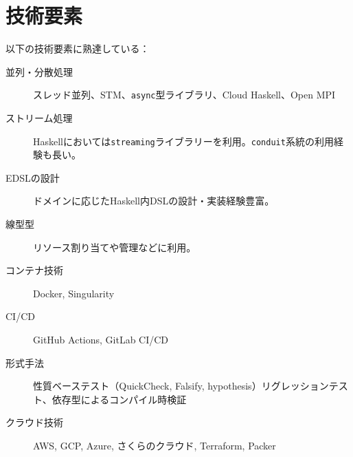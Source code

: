 \documentclass[a4j,draft]{ltjsarticle}
\begin{document}
\section*{技術要素}
以下の技術要素に熟達している：

\begin{description}
  \item[並列・分散処理] スレッド並列、STM、\texttt{async}型ライブラリ、Cloud Haskell、Open MPI
  \item[ストリーム処理] Haskellにおいては\texttt{streaming}ライブラリーを利用。\texttt{conduit}系統の利用経験も長い。
  \item[EDSLの設計] ドメインに応じたHaskell内DSLの設計・実装経験豊富。
  \item[線型型] リソース割り当てや管理などに利用。
  \item[コンテナ技術] Docker, Singularity
  \item[CI/CD] GitHub Actions, GitLab CI/CD
  \item[形式手法] 性質ベーステスト（QuickCheck, Falsify, hypothesis）リグレッションテスト、依存型によるコンパイル時検証
  \item[クラウド技術] AWS, GCP, Azure, さくらのクラウド, Terraform, Packer
\end{description}
\end{document}
